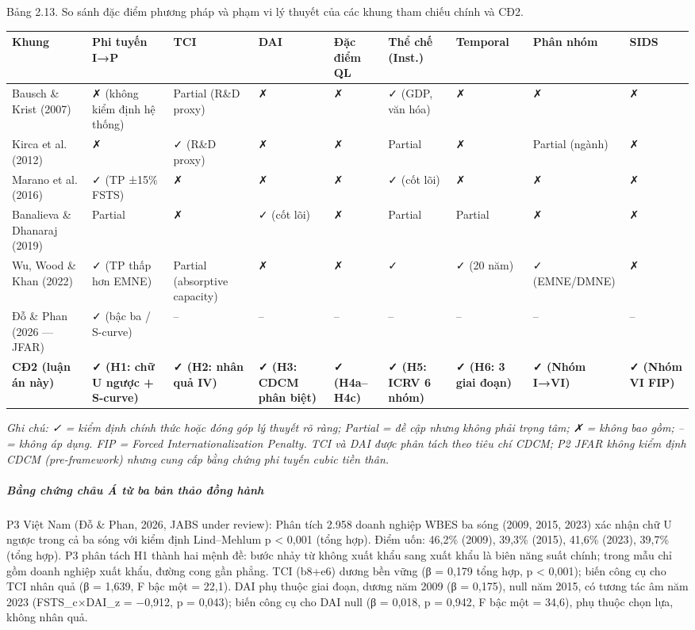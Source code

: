 \documentclass[12pt,a4paper]{article}
\begin{document}
Bảng 2.13. So sánh đặc điểm phương pháp và phạm vi lý thuyết của các
khung tham chiếu chính và CĐ2.

\begin{longtable}[]{@{}lllllllll@{}}
\toprule\noalign{}
Khung & Phi tuyến I→P & TCI & DAI & Đặc điểm QL & Thể chế (Inst.) &
Temporal & Phân nhóm & SIDS \\
\midrule\noalign{}
\endhead
\bottomrule\noalign{}
\endlastfoot
Bausch \& Krist (2007) & ✗ (không kiểm định hệ thống) & Partial (R\&D
proxy) & ✗ & ✗ & ✓ (GDP, văn hóa) & ✗ & ✗ & ✗ \\
Kirca et al. (2012) & ✗ & ✓ (R\&D proxy) & ✗ & ✗ & Partial & ✗ & Partial
(ngành) & ✗ \\
Marano et al. (2016) & ✓ (TP ±15\% FSTS) & ✗ & ✗ & ✗ & ✓ (cốt lõi) & ✗ &
✗ & ✗ \\
Banalieva \& Dhanaraj (2019) & Partial & ✗ & ✓ (cốt lõi) & ✗ & Partial &
Partial & ✗ & ✗ \\
Wu, Wood \& Khan (2022) & ✓ (TP thấp hơn EMNE) & Partial (absorptive
capacity) & ✗ & ✗ & ✓ & ✓ (20 năm) & ✓ (EMNE/DMNE) & ✗ \\
Đỗ \& Phan (2026 --- JFAR) & ✓ (bậc ba / S-curve) & -- & -- & -- & -- &
-- & -- & -- \\
\textbf{CĐ2 (luận án này)} & \textbf{✓ (H1: chữ U ngược + S-curve)} &
\textbf{✓ (H2: nhân quả IV)} & \textbf{✓ (H3: CDCM phân biệt)} &
\textbf{✓ (H4a--H4c)} & \textbf{✓ (H5: ICRV 6 nhóm)} & \textbf{✓ (H6: 3
giai đoạn)} & \textbf{✓ (Nhóm I→VI)} & \textbf{✓ (Nhóm VI FIP)} \\
\end{longtable}

\emph{Ghi chú: ✓ = kiểm định chính thức hoặc đóng góp lý thuyết rõ ràng;
Partial = đề cập nhưng không phải trọng tâm; ✗ = không bao gồm; -- =
không áp dụng. FIP = Forced Internationalization Penalty. TCI và DAI
được phân tách theo tiêu chí CDCM; P2 JFAR không kiểm định CDCM
(pre-framework) nhưng cung cấp bằng chứng phi tuyến cubic tiền thân.}

\hypertarget{bux1eb1ng-chux1ee9ng-chuxe2u-uxe1-tux1eeb-ba-bux1ea3n-thux1ea3o-ux111ux1ed3ng-huxe0nh}{%
\subparagraph{Bằng chứng châu Á từ ba bản thảo đồng
hành}\label{bux1eb1ng-chux1ee9ng-chuxe2u-uxe1-tux1eeb-ba-bux1ea3n-thux1ea3o-ux111ux1ed3ng-huxe0nh}}

P3 Việt Nam (Đỗ \& Phan, 2026, JABS under review): Phân tích 2.958 doanh
nghiệp WBES ba sóng (2009, 2015, 2023) xác nhận chữ U ngược trong cả ba
sóng với kiểm định Lind--Mehlum p \textless{} 0,001 (tổng hợp). Điểm
uốn: 46,2\% (2009), 39,3\% (2015), 41,6\% (2023), 39,7\% (tổng hợp). P3
phân tách H1 thành hai mệnh đề: bước nhảy từ không xuất khẩu sang xuất
khẩu là biên năng suất chính; trong mẫu chỉ gồm doanh nghiệp xuất khẩu,
đường cong gần phẳng. TCI (b8+e6) dương bền vững (β = 0,179 tổng hợp, p
\textless{} 0,001); biến công cụ cho TCI nhân quả (β = 1,639, F bậc một
= 22,1). DAI phụ thuộc giai đoạn, dương năm 2009 (β = 0,175), null năm
2015, có tương tác âm năm 2023 (FSTS\_c×DAI\_z = −0,912, p = 0,043);
biến công cụ cho DAI null (β = 0,018, p = 0,942, F bậc một = 34,6), phụ
thuộc chọn lựa, không nhân quả.
\end{document}
